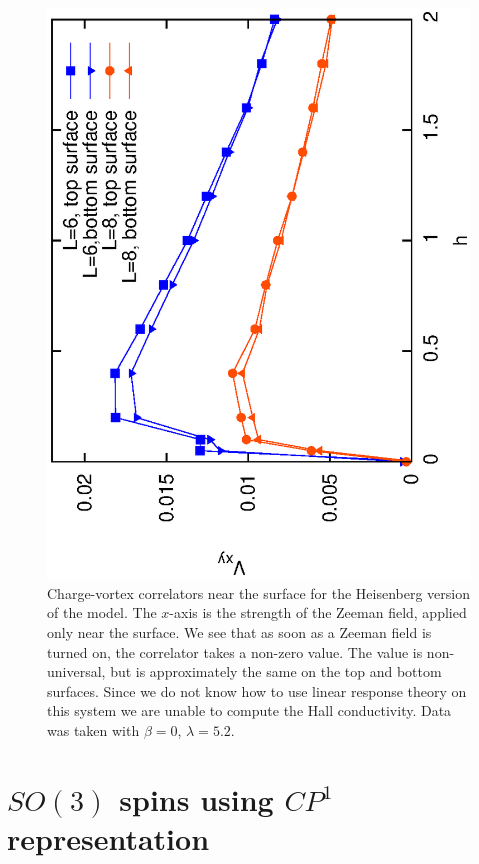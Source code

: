 \documentclass[prb,twocolumn]{revtex4-1}
\begin{document}
\begin{figure}
\includegraphics[angle=-90,width=0.9\linewidth]{figures/vortexcor.eps}
\caption{Charge-vortex correlators near the surface for the Heisenberg version of the model. The $x$-axis is the strength of the Zeeman field, applied only near the surface. We see that as soon as a Zeeman field is turned on, the correlator takes a non-zero value. The value is non-universal, but is approximately the same on the top and bottom surfaces. Since we do not know how to use linear response theory on this system we are unable to compute the Hall conductivity. Data was taken with $\beta=0$, $\lambda=5.2$.}
\label{heishall}
\end{figure}




\section{$SO(3)$ spins using $CP^1$ representation}
\label{section::CP1}
\end{document}
